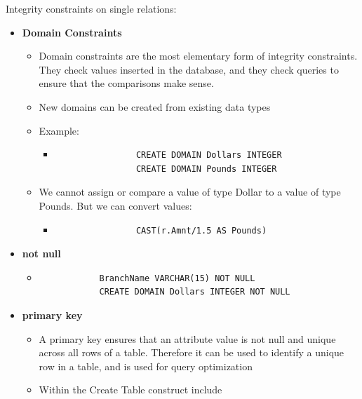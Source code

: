 Integrity constraints on single relations:
\begin{itemize}
    \item \textbf{Domain Constraints}
    \begin{itemize}
        \item Domain constraints are the most elementary form of integrity constraints. They check values inserted in the database, and they check queries to ensure that the comparisons make sense.
        \item New domains can be created from existing data types
        \item Example:
        \begin{itemize}
            \item[] \begin{lstlisting}
                CREATE DOMAIN Dollars INTEGER
                CREATE DOMAIN Pounds INTEGER
            \end{lstlisting}
        \end{itemize}
        \item We cannot assign or compare a value of type Dollar to a value of type Pounds. But we can convert values: 
        \begin{itemize}
            \item[] \begin{lstlisting}
                CAST(r.Amnt/1.5 AS Pounds)
            \end{lstlisting}
        \end{itemize}
    \end{itemize}
    \item \textbf{not null}
    \begin{itemize}
        \item[] \begin{lstlisting}
            BranchName VARCHAR(15) NOT NULL
            CREATE DOMAIN Dollars INTEGER NOT NULL
        \end{lstlisting}
    \end{itemize}
    \item \textbf{primary key}
    \begin{itemize}
        \item A primary key ensures that an attribute value is not null and unique across all rows of a table. Therefore it can be used to identify a unique row in a table, and is used for query optimization
        \item Within the Create Table construct include \begin{lstlisting}

\end{lstlisting}
\end{itemize}
\end{itemize}
